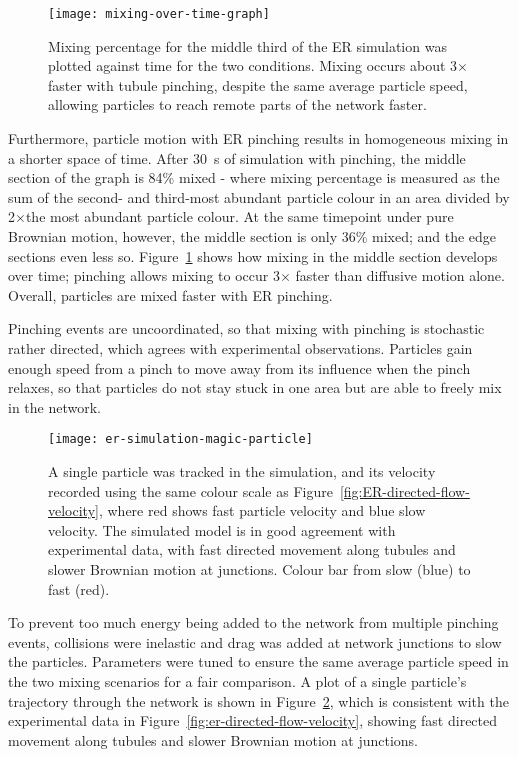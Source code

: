 \begin{figure}[b!]
	\centering
	\texttt{[image: mixing-over-time-graph]}
	\caption[ER simulation: Tubule pinching provides faster mixing than Brownian motion alone]{Mixing percentage for the middle third of the ER simulation was plotted against time for the two conditions. Mixing occurs about 3$\times$ faster with tubule pinching, despite the same average particle speed, allowing particles to reach remote parts of the network faster.}
	\label{fig:mixing-over-time-graph}
\end{figure}

Furthermore, particle motion with ER pinching results in homogeneous mixing in a shorter space of time.
After \SI{30}{\second} of simulation with pinching, the middle section of the graph is 84\% mixed - where mixing percentage is measured as the sum of the second- and third-most abundant particle colour in an area divided by 2$\times$the most abundant particle colour.
At the same timepoint under pure Brownian motion, however, the middle section is only 36\% mixed; and the edge sections even less so.
Figure~\ref{fig:mixing-over-time-graph} shows how mixing in the middle section develops over time; pinching allows mixing to occur 3$\times$ faster than diffusive motion alone.
Overall, particles are mixed faster with ER pinching.

Pinching events are uncoordinated, so that mixing with pinching is stochastic rather directed, which agrees with experimental observations.
Particles gain enough speed from a pinch to move away from its influence when the pinch relaxes, so that particles do not stay stuck in one area but are able to freely mix in the network.

\begin{figure}[t!]
	\centering
	\texttt{[image: er-simulation-magic-particle]}
	\caption[ER simulation: The simulated model shows similar particle velocity tracks to experimental data]{A single particle was tracked in the simulation, and its velocity recorded using the same colour scale as Figure~\ref{fig:ER-directed-flow-velocity}, where red shows fast particle velocity and blue slow velocity. The simulated model is in good agreement with experimental data, with fast directed movement along tubules and slower Brownian motion at junctions. Colour bar from slow (blue) to fast (red). }
	\label{fig:ER-simulation-magic-particle}
\end{figure}

To prevent too much energy being added to the network from multiple pinching events, collisions were inelastic and drag was added at network junctions to slow the particles.
Parameters were tuned to ensure the same average particle speed in the two mixing scenarios for a fair comparison.
A plot of a single particle's trajectory through the network is shown in Figure~\ref{fig:ER-simulation-magic-particle}, which is consistent with the experimental data in Figure~\ref{fig:er-directed-flow-velocity}, showing fast directed movement along tubules and slower Brownian motion at junctions.

